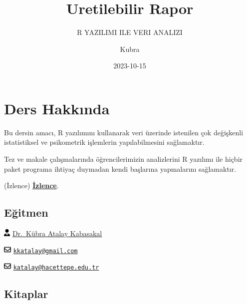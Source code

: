 \documentclass[
  oneside]{book}
\title{Uretilebilir Rapor}
\subtitle{R YAZILIMI ILE VERI ANALIZI}
\author{Kubra}
\date{2023-10-15}
\begin{document}
\maketitle

{
\setcounter{tocdepth}{1}
\tableofcontents
}
\hypertarget{ders-hakkux131nda}{%
\chapter*{Ders Hakkında}\label{ders-hakkux131nda}}

Bu dersin amacı, R yazılımını kullanarak veri üzerinde istenilen çok değişkenli istatistiksel ve psikometrik işlemlerin yapılabilmesini sağlamaktır.

Tez ve makale çalışmalarında öğrencilerimizin analizlerini R yazılımı ile hiçbir paket programa ihtiyaç duymadan kendi başlarına yapmalarını sağlamaktır.

(İzlence) \href{Izlence.html}{\textbf{İzlence}}.

\hypertarget{eux11fitmen}{%
\section*{Eğitmen}\label{eux11fitmen}}

\includegraphics[width=0.88em,height=1em]{index_files/figure-latex/fa-icon-b6db0f254c80bc493dbb13c250115ecc.pdf} \href{https://avesis.hacettepe.edu.tr/katalay}{Dr.~Kübra Atalay Kabasakal}

\includegraphics[width=1em,height=1em]{index_files/figure-latex/fa-icon-f768fe0dd920858851ba0f42fb5fcbf3.pdf} \href{mailto:kkatalay@gmail.com}{\nolinkurl{kkatalay@gmail.com}}

\includegraphics[width=1em,height=1em]{index_files/figure-latex/fa-icon-f768fe0dd920858851ba0f42fb5fcbf3.pdf} \href{mailto:katalay@hacettepe.edu.tr}{\nolinkurl{katalay@hacettepe.edu.tr}}

\hypertarget{kitaplar}{%
\section*{Kitaplar}\label{kitaplar}}
\end{document}
